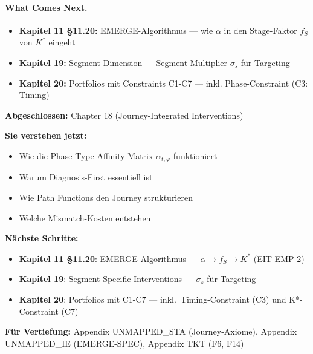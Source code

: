 \paragraph{What Comes Next.}
\begin{itemize}[nosep]
\item \textbf{Kapitel 11 §11.20:} EMERGE-Algorithmus --- wie $\alpha$ in den Stage-Faktor $f_S$ von $K^*$ eingeht
\item \textbf{Kapitel 19:} Segment-Dimension --- Segment-Multiplier $\sigma_s$ für Targeting
\item \textbf{Kapitel 20:} Portfolios mit Constraints C1-C7 --- inkl. Phase-Constraint (C3: Timing)
\end{itemize}



\begin{tcolorbox}[colback=gray!5!white, colframe=gray!75!black,
    title=Empfohlene Lesepfade]

\textbf{Abgeschlossen:} Chapter 18 (Journey-Integrated Interventions)

\textbf{Sie verstehen jetzt:}
\begin{itemize}[nosep]
\item Wie die Phase-Type Affinity Matrix $\alpha_{t,\varphi}$ funktioniert
\item Warum Diagnosis-First essentiell ist
\item Wie Path Functions den Journey strukturieren
\item Welche Mismatch-Kosten entstehen
\end{itemize}

\textbf{Nächste Schritte:}
\begin{itemize}[nosep]
\item \textbf{Kapitel 11 §11.20}: EMERGE-Algorithmus --- $\alpha \to f_S \to K^*$ (EIT-EMP-2)
\item \textbf{Kapitel 19}: Segment-Specific Interventions --- $\sigma_s$ für Targeting
\item \textbf{Kapitel 20}: Portfolios mit C1-C7 --- inkl.\ Timing-Constraint (C3) und K*-Constraint (C7)
\end{itemize}

\textbf{Für Vertiefung:} Appendix UNMAPPED_STA (Journey-Axiome), Appendix UNMAPPED_IE (EMERGE-SPEC), Appendix TKT (F6, F14)
\end{tcolorbox}


